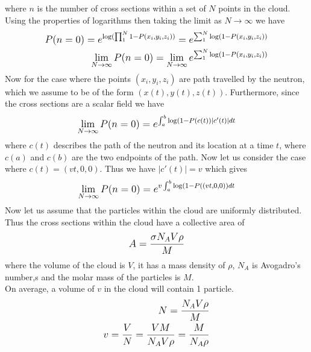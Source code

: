 \documentclass[12pt]{article}
\begin{document}
where $n$ is the number of cross sections within a set of $N$ points in the cloud. 
Using the properties of logarithms then taking the limit as $N\to\infty$ we have
\begin{equation}
\begin{split}
\mathlarger{
P(n=0) = e^{\log(\prod_{1}^{N} 1-P(x_i,y_i,z_i))} = e^{\sum_{1}^{N}\log(1-P(x_i,y_i,z_i))}
}\\
\mathlarger{
\lim_{N\to\infty}P(n=0) = \lim_{N\to\infty} e^{\sum_{1}^{N}\log(1-P(x_i,y_i,z_i))}
}
\end{split}
\end{equation}
Now for the case where the points $(x_i,y_i,z_i)$ are path travelled by the neutron, which we assume to be of the form $(x(t), y(t), z(t))$. Furthermore, since the cross sections are a scalar field we have
\begin{equation}
\begin{split}
\mathlarger{
\lim_{N\to\infty}P(n=0) =  e^{\int_a^b\log(1-P(c(t))\mid c'(t)\mid dt} 
} \\
\end{split}
\end{equation}
where $c(t)$ describes the path of the neutron and its location at a time $t$, where $c(a)$ and $c(b)$ are the two endpoints of the path. Now let us consider the case where $c(t) = (vt, 0, 0)$. Thus we have $\mid c'(t)\mid = v$ which gives
\begin{equation}
\begin{split}
\mathlarger{
\lim_{N\to\infty}P(n=0) =  e^{v\int_a^b\log(1-P((vt, 0, 0))dt} 
} \\
\end{split}
\end{equation}
Now let us assume that the particles within the cloud are uniformly distributed. Thus the cross sections within the cloud have a collective area of
\begin{equation}
\begin{split}
\mathlarger{
A = \frac{\sigma N_AV\rho}{M}
}\\
\end{split}
\end{equation}
where the volume of the cloud is $V$, it has a mass density of $\rho$, $N_A$ is Avogadro's number,s and the molar mass of the particles is $M$. \\
On average, a volume of $v$ in the cloud will contain 1 particle. 
\begin{equation}
\begin{split}
\mathlarger{
N = \frac{N_AV\rho}{M}
}\\
\mathlarger{
v = \frac{V}{N} = \frac{VM}{N_AV\rho} = \frac{M}{N_A\rho}
}\\
\end{split}
\end{equation}
\end{document}
